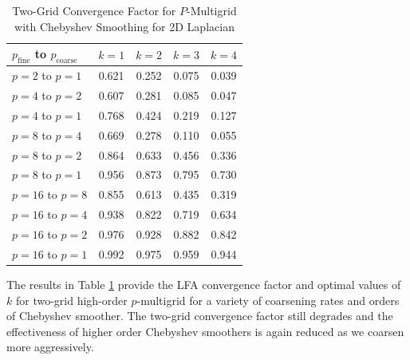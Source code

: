 \begin{table}[ht!]
\begin{center}
\begin{tabular}{l c c c c}
  \toprule
  $p_{\text{fine}}$ to $p_{\text{coarse}}$  &  $k = 1$   &  $k = 2$   &  $k = 3$   &  $k = 4$   \\
  \toprule
  $p = 2$ to $p = 1$   &  0.621  &  0.252  &  0.075  &  0.039  \\
  \midrule
  $p = 4$ to $p = 2$   &  0.607  &  0.281  &  0.085  &  0.047  \\
  $p = 4$ to $p = 1$   &  0.768  &  0.424  &  0.219  &  0.127  \\
  \midrule
  $p = 8$ to $p = 4$   &  0.669  &  0.278  &  0.110  &  0.055  \\
  $p = 8$ to $p = 2$   &  0.864  &  0.633  &  0.456  &  0.336  \\
  $p = 8$ to $p = 1$   &  0.956  &  0.873  &  0.795  &  0.730  \\
  \midrule
  $p = 16$ to $p = 8$  &  0.855  &  0.613  &  0.435  &  0.319  \\
  $p = 16$ to $p = 4$  &  0.938  &  0.822  &  0.719  &  0.634  \\
  $p = 16$ to $p = 2$  &  0.976  &  0.928  &  0.882  &  0.842  \\
  $p = 16$ to $p = 1$  &  0.992  &  0.975  &  0.959  &  0.944  \\
  \bottomrule
\end{tabular}
\end{center}
\caption{Two-Grid Convergence Factor for $P$-Multigrid with Chebyshev Smoothing for 2D Laplacian}
\label{table:two_grid_2d_chebyshev}
\end{table}

The results in Table \ref{table:two_grid_2d_chebyshev} provide the LFA convergence factor and optimal values of $k$ for two-grid high-order $p$-multigrid for a variety of coarsening rates and orders of Chebyshev smoother.
The two-grid convergence factor still degrades and the effectiveness of higher order Chebyshev smoothers is again reduced as we coarsen more aggressively.

